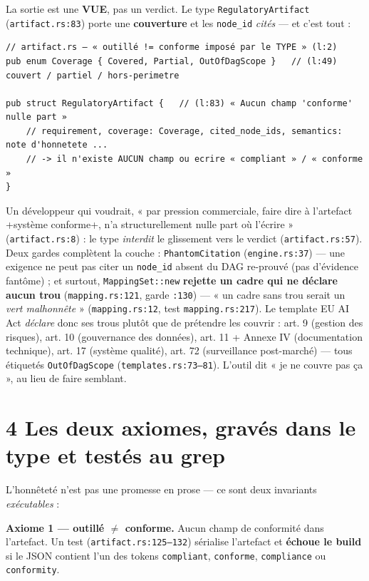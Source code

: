 \documentclass[11pt]{article}
\begin{document}
La sortie est une \textbf{VUE}, pas un verdict. Le type \texttt{RegulatoryArtifact}
(\texttt{artifact.rs:83}) porte une \textbf{couverture} et les \texttt{node\_id} \emph{cités} — et
c'est tout :
\begin{lstlisting}
// artifact.rs — « outillé != conforme imposé par le TYPE » (l:2)
pub enum Coverage { Covered, Partial, OutOfDagScope }   // (l:49) couvert / partiel / hors-perimetre

pub struct RegulatoryArtifact {   // (l:83) « Aucun champ 'conforme' nulle part »
    // requirement, coverage: Coverage, cited_node_ids, semantics: note d'honnetete ...
    // -> il n'existe AUCUN champ ou ecrire « compliant » / « conforme »
}
\end{lstlisting}
Un développeur qui voudrait, « par pression commerciale, faire dire à l'artefact +système
conforme+, n'a structurellement nulle part où l'écrire » (\texttt{artifact.rs:8}) : le type
\emph{interdit} le glissement vers le verdict (\texttt{artifact.rs:57}). Deux gardes complètent
la couche : \texttt{PhantomCitation} (\texttt{engine.rs:37}) — une exigence ne peut pas citer un
\texttt{node\_id} absent du DAG re-prouvé (pas d'évidence fantôme) ; et surtout,
\texttt{MappingSet::new} \textbf{rejette un cadre qui ne déclare aucun trou}
(\texttt{mapping.rs:121}, garde \texttt{:130}) — « un cadre sans trou serait un \emph{vert
malhonnête} » (\texttt{mapping.rs:12}, test \texttt{mapping.rs:217}). Le template EU AI Act \emph{déclare} donc ses trous plutôt que de prétendre les
couvrir : art. 9 (gestion des risques), art. 10 (gouvernance des données), art. 11 + Annexe IV
(documentation technique), art. 17 (système qualité), art. 72 (surveillance post-marché) — tous
étiquetés \texttt{OutOfDagScope} (\texttt{templates.rs:73--81}). L'outil dit « je ne couvre pas
ça », au lieu de faire semblant.

\section{4 \;\textbar\; Les deux axiomes, gravés dans le type et testés au grep}
L'honnêteté n'est pas une promesse en prose — ce sont deux invariants \emph{exécutables} :

\smallskip
\textbf{Axiome 1 — outillé $\neq$ conforme.} Aucun champ de conformité dans l'artefact. Un test
(\texttt{artifact.rs:125--132}) sérialise l'artefact et \textbf{échoue le build} si le JSON
contient l'un des tokens \texttt{compliant}, \texttt{conforme}, \texttt{compliance} ou
\texttt{conformity}.
\end{document}

